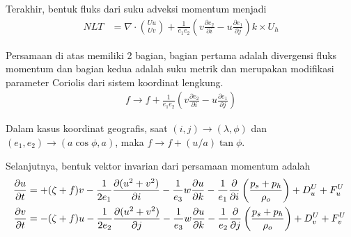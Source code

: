 \begin{spacing}{1.5}
	Terakhir, bentuk fluks dari suku adveksi momentum menjadi
	\begin{equation}
		\begin{aligned}
			NLT &= \nabla \cdot \binom{Uu}{Uv} +  \frac{1}{e_1e_2}\left(v\frac{\partial e_2}{\partial i}-u\frac{\partial e_1}{\partial j}\right)k \times U_h
		\end{aligned}
	\end{equation}

	Persamaan di atas memiliki 2 bagian, bagian pertama adalah divergensi fluks momentum dan bagian kedua adalah suku metrik dan merupakan modifikasi parameter Coriolis dari sistem koordinat lengkung.
	\begin{equation*}
		\begin{aligned}
			f \rightarrow f +  \frac{1}{e_1e_2}\left(v\frac{\partial e_2}{\partial i}-u\frac{\partial e_1}{\partial j}\right)
		\end{aligned}
	\end{equation*}

	Dalam kasus koordinat geografis, saat $(i,j)\rightarrow(\lambda,\phi)$ dan $(e_1,e_2)\rightarrow(a\cos \phi, a)$, maka $f\rightarrow f+(u/a)\tan \phi$.
	
	Selanjutnya, bentuk vektor invarian dari persamaan momentum adalah
	\begin{equation}
		    \resizebox{\textwidth}{!}{%
			$
		\begin{aligned}
			\frac{\partial u}{\partial t} &= +(\zeta +f)v -  \frac{1}{2e_1}\frac{\partial (u^2+v^2)}{\partial i}-\frac{1}{e_3}w\frac{\partial u}{\partial k} - \frac{1}{e_1}\frac{\partial}{\partial i}\left(\frac{p_s+p_h}{\rho_o}\right)+D^U_u+F^U_u  \\
			\frac{\partial v}{\partial t} &= -(\zeta +f)u -  \frac{1}{2e_2}\frac{\partial (u^2+v^2)}{\partial j}-\frac{1}{e_3}w\frac{\partial u}{\partial k} - \frac{1}{e_2}\frac{\partial}{\partial j}\left(\frac{p_s+p_h}{\rho_o}\right)+D^U_v+F^U_v%
		\end{aligned}
			$
		}
	\end{equation}


\end{spacing}
